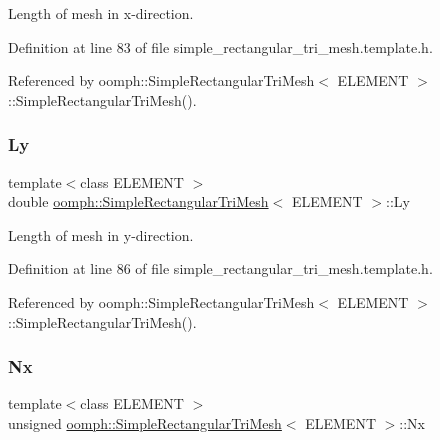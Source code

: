 Length of mesh in x-\/direction. 



Definition at line 83 of file simple\+\_\+rectangular\+\_\+tri\+\_\+mesh.\+template.\+h.



Referenced by oomph\+::\+Simple\+Rectangular\+Tri\+Mesh$<$ E\+L\+E\+M\+E\+N\+T $>$\+::\+Simple\+Rectangular\+Tri\+Mesh().

\mbox{\label{classoomph_1_1SimpleRectangularTriMesh_adc35409d2a480d6de11d8df4ec23d1cf}} 
\subsubsection{\texorpdfstring{Ly}{Ly}}
{\footnotesize\ttfamily template$<$class E\+L\+E\+M\+E\+NT $>$ \\
double \hyperlink{classoomph_1_1SimpleRectangularTriMesh}{oomph\+::\+Simple\+Rectangular\+Tri\+Mesh}$<$ E\+L\+E\+M\+E\+NT $>$\+::Ly\hspace{0.3cm}{\ttfamily [private]}}



Length of mesh in y-\/direction. 



Definition at line 86 of file simple\+\_\+rectangular\+\_\+tri\+\_\+mesh.\+template.\+h.



Referenced by oomph\+::\+Simple\+Rectangular\+Tri\+Mesh$<$ E\+L\+E\+M\+E\+N\+T $>$\+::\+Simple\+Rectangular\+Tri\+Mesh().

\mbox{\label{classoomph_1_1SimpleRectangularTriMesh_ad997a3ce1ed243b79cd49eb5a0687844}} 
\subsubsection{\texorpdfstring{Nx}{Nx}}
{\footnotesize\ttfamily template$<$class E\+L\+E\+M\+E\+NT $>$ \\
unsigned \hyperlink{classoomph_1_1SimpleRectangularTriMesh}{oomph\+::\+Simple\+Rectangular\+Tri\+Mesh}$<$ E\+L\+E\+M\+E\+NT $>$\+::Nx\hspace{0.3cm}{\ttfamily [private]}}



